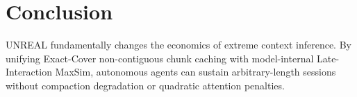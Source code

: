\documentclass[10pt,journal,compsoc]{IEEEtran}
\begin{document}
\section{Conclusion}
UNREAL fundamentally changes the economics of extreme context inference. By unifying Exact-Cover non-contiguous chunk caching with model-internal Late-Interaction MaxSim, autonomous agents can sustain arbitrary-length sessions without compaction degradation or quadratic attention penalties.


\end{document}
